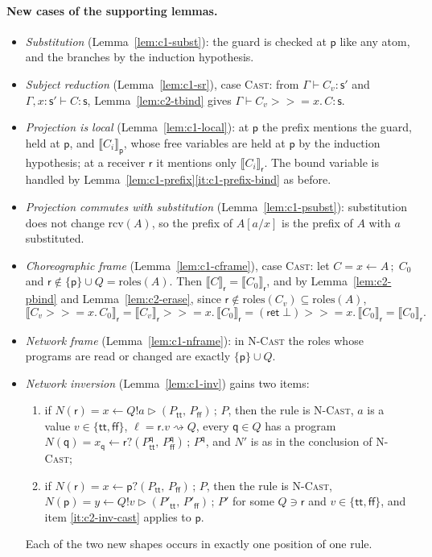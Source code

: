 \documentclass[11pt]{report}
\theoremstyle{plain}
\theoremstyle{definition}
\theoremstyle{remark}
\newcommand{\kw}[1]{\mathsf{#1}}
\newcommand{\pp}{\mathsf{p}}
\newcommand{\qq}{\mathsf{q}}
\newcommand{\rr}{\mathsf{r}}
\newcommand{\sr}{\mathsf{s}}
\newcommand{\ttrue}{\kw{tt}}
\newcommand{\ffalse}{\kw{ff}}
\newcommand{\bind}[3]{#1 \leftarrow #2\,;\;#3}
\newcommand{\mbind}[3]{#1 \mathbin{>\!\!>\!\!=} #2.\,#3}
\newcommand{\roles}[1]{\mathrm{roles}(#1)}
\newcommand{\rcv}[1]{\mathrm{rcv}(#1)}
\newcommand{\castlbl}[3]{#1.#2 \rightsquigarrow #3}
\newcommand{\sendbr}[4]{#1!#2 \mathbin{\triangleright} (#3,\,#4)}
\newcommand{\recvbr}[3]{#1?(#2,\,#3)}
\newcommand{\proj}[2]{\llbracket #1 \rrbracket_{#2}}
\newcommand{\rn}[1]{{\normalfont\scshape #1}}
\begin{document}
\paragraph{New cases of the supporting lemmas.}
\begin{itemize}
\item \emph{Substitution} (Lemma~\ref{lem:c1-subst}): the guard is checked at
  $\pp$ like any atom, and the branches by the induction hypothesis.
\item \emph{Subject reduction} (Lemma~\ref{lem:c1-sr}), case \rn{Cast}: from
  $\Gamma\vdash C_v:\sr'$ and $\Gamma,x{:}\sr'\vdash C:\sr$,
  Lemma~\ref{lem:c2-tbind} gives $\Gamma\vdash\mbind{C_v}{x}{C}:\sr$.
\item \emph{Projection is local} (Lemma~\ref{lem:c1-local}): at $\pp$ the
  prefix mentions the guard, held at $\pp$, and $\proj{C_i}{\pp}$, whose free
  variables are held at $\pp$ by the induction hypothesis; at a receiver
  $\rr$ it mentions only $\proj{C_i}{\rr}$.  The bound variable is handled by
  Lemma~\ref{lem:c1-prefix}\ref{it:c1-prefix-bind} as before.
\item \emph{Projection commutes with substitution} (Lemma~\ref{lem:c1-psubst}):
  substitution does not change $\rcv{A}$, so the prefix of $A[a/x]$ is the
  prefix of $A$ with $a$ substituted.
\item \emph{Choreographic frame} (Lemma~\ref{lem:c1-cframe}), case \rn{Cast}:
  let $C=\bind{x}{A}{C_0}$ and $\rr\notin\{\pp\}\cup Q=\roles{A}$.  Then
  $\proj{C}{\rr}=\proj{C_0}{\rr}$, and by Lemma~\ref{lem:c2-pbind} and
  Lemma~\ref{lem:c2-erase}, since $\rr\notin\roles{C_v}\subseteq\roles{A}$,
  \[
    \proj{\mbind{C_v}{x}{C_0}}{\rr}
    = \mbind{\proj{C_v}{\rr}}{x}{\proj{C_0}{\rr}}
    = \mbind{(\kw{ret}\;\bot)}{x}{\proj{C_0}{\rr}}
    = \proj{C_0}{\rr}.
  \]
\item \emph{Network frame} (Lemma~\ref{lem:c1-nframe}): in \rn{N-Cast} the
  roles whose programs are read or changed are exactly $\{\pp\}\cup Q$.
\item \emph{Network inversion} (Lemma~\ref{lem:c1-inv}) gains two items:
  \begin{enumerate}[label=(\alph*),start=4,nosep]
  \item\label{it:c2-inv-cast} if $N(\rr)=x\leftarrow\sendbr{Q}{a}{P_\ttrue}{P_\ffalse}\,;\,P$,
    then the rule is \rn{N-Cast}, $a$ is a value $v\in\{\ttrue,\ffalse\}$,
    $\ell=\castlbl{\rr}{v}{Q}$, every $\qq\in Q$ has a program
    $N(\qq)=x_\qq\leftarrow\recvbr{\rr}{P^\qq_\ttrue}{P^\qq_\ffalse}\,;\,P^\qq$,
    and $N'$ is as in the conclusion of \rn{N-Cast};
  \item\label{it:c2-inv-brecv} if $N(\rr)=x\leftarrow\recvbr{\pp}{P_\ttrue}{P_\ffalse}\,;\,P$,
    then the rule is \rn{N-Cast}, $N(\pp)=y\leftarrow\sendbr{Q}{v}{P'_\ttrue}{P'_\ffalse}\,;\,P'$
    for some $Q\ni\rr$ and $v\in\{\ttrue,\ffalse\}$, and item
    \ref{it:c2-inv-cast} applies to $\pp$.
  \end{enumerate}
  Each of the two new shapes occurs in exactly one position of one rule.
\end{itemize}
\end{document}
